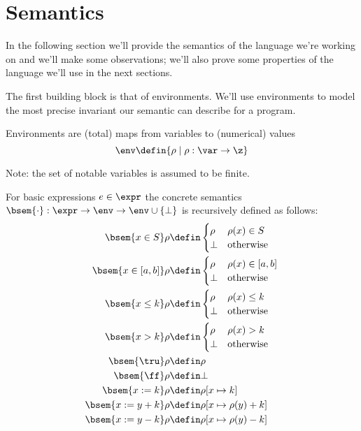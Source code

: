 \section{Semantics}

In the following section we'll provide the semantics of the language
we're working on and we'll make some observations; we'll also prove
some properties of the language we'll use in the next sections.

The first building block is that of environments. We'll use
environments to model the most precise invariant our semantic can
describe for a program.

\begin{definition}[Environments]
  Environments are (total) maps from variables to (numerical)
  values \[\env \defin \{\rho \mid \rho : \var \to \z\}\]

  Note: the set of notable variables is assumed to be finite.
\end{definition}

\begin{definition}
  For basic expressions \(e \in \expr\) the concrete semantics \(\bsem{
    \cdot} : \expr \to \env \to \env \cup \{\bot\}\) is recursively
  defined as follows:
  \begin{align*}
    \bsem{ x\in S} \rho & \defin \begin{cases} \rho & \rho(x)\in S \\ \bot & \text{otherwise} \end{cases} \\
    \bsem{ x\in [a,b]} \rho & \defin \begin{cases} \rho & \rho(x)\in [a,b] \\ \bot & \text{otherwise} \end{cases} \\
    \bsem{ x \leq k} \rho & \defin \begin{cases} \rho & \rho(x)\leq k \\ \bot & \text{otherwise} \end{cases} \\
    \bsem{ x > k} \rho & \defin \begin{cases} \rho & \rho(x) > k \\ \bot & \text{otherwise} \end{cases} \\
    \bsem{ \tru} \rho & \defin \rho \\
    \bsem{ \ff} \rho & \defin \bot \\
    \bsem{ x := k} \rho & \defin \rho [x \mapsto k] \\
    \bsem{ x := y + k} \rho & \defin \rho [x \mapsto \rho(y) + k] \\
    \bsem{ x := y - k} \rho & \defin \rho [x \mapsto \rho(y) - k] \\
  \end{align*}
\end{definition}

